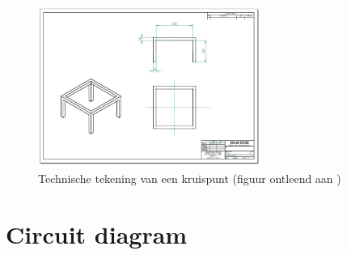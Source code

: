 \documentclass[a4paper,kulak]{kulakarticle}
\begin{document}
\begin{appendices}
\begin{figure}[h]
	\centering
	\includegraphics[width=0.65\textwidth]{tafelstel.png}
	\caption{Technische tekening van een kruispunt (figuur ontleend aan \cite{opgave})}
	\label{techtekkruispunt}
\end{figure}


\section{Circuit diagram}


\end{appendices}
\end{document}
